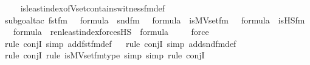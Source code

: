 \begin{isabellebody}
%
\isadelimproof
\isanewline
\ \ %
\endisadelimproof
%
\isatagproof
{}\isamarkupfalse%
\ is{\isacharunderscore}{\kern0pt}least{\isacharunderscore}{\kern0pt}index{\isacharunderscore}{\kern0pt}of{\isacharunderscore}{\kern0pt}Vset{\isacharunderscore}{\kern0pt}contains{\isacharunderscore}{\kern0pt}witness{\isacharunderscore}{\kern0pt}fm{\isacharunderscore}{\kern0pt}def\isanewline
\ \ \isamarkupfalse%
{\isacharparenleft}{\kern0pt}subgoal{\isacharunderscore}{\kern0pt}tac\ {\isachardoublequoteopen}fst{\isacharunderscore}{\kern0pt}fm{\isacharparenleft}{\kern0pt}{}{\isacharcomma}{\kern0pt}\ {}{\isacharparenright}{\kern0pt}\ {\isasymin}\ formula\ {\isasymand}\ snd{\isacharunderscore}{\kern0pt}fm{\isacharparenleft}{\kern0pt}{}{\isacharcomma}{\kern0pt}\ {}{\isacharparenright}{\kern0pt}\ {\isasymin}\ formula\ {\isasymand}\ is{\isacharunderscore}{\kern0pt}MVset{\isacharunderscore}{\kern0pt}fm{\isacharparenleft}{\kern0pt}{}{\isacharcomma}{\kern0pt}\ {}{\isacharparenright}{\kern0pt}\ {\isasymin}\ formula\ {\isasymand}\ is{\isacharunderscore}{\kern0pt}HS{\isacharunderscore}{\kern0pt}fm{\isacharparenleft}{\kern0pt}{}{}{\isacharcomma}{\kern0pt}\ {}{\isacharparenright}{\kern0pt}\ {\isasymin}\ formula\ {\isasymand}\ ren{\isacharunderscore}{\kern0pt}least{\isacharunderscore}{\kern0pt}index{\isacharparenleft}{\kern0pt}forcesHS{\isacharparenleft}{\kern0pt}{\isasymphi}{\isacharparenright}{\kern0pt}{\isacharparenright}{\kern0pt}\ {\isasymin}\ formula{\isachardoublequoteclose}{\isacharparenright}{\kern0pt}\isanewline
\ \ \ \isamarkupfalse%
\ force\isanewline
\ \ \isamarkupfalse%
{\isacharparenleft}{\kern0pt}rule\ conjI{\isacharcomma}{\kern0pt}\ simp\ add{\isacharcolon}{\kern0pt}fst{\isacharunderscore}{\kern0pt}fm{\isacharunderscore}{\kern0pt}def{\isacharparenright}{\kern0pt}\isanewline
\ \ \isamarkupfalse%
{\isacharparenleft}{\kern0pt}rule\ conjI{\isacharcomma}{\kern0pt}\ simp\ add{\isacharcolon}{\kern0pt}snd{\isacharunderscore}{\kern0pt}fm{\isacharunderscore}{\kern0pt}def{\isacharparenright}{\kern0pt}\isanewline
\ \ \isamarkupfalse%
{\isacharparenleft}{\kern0pt}rule\ conjI{\isacharcomma}{\kern0pt}\ rule\ is{\isacharunderscore}{\kern0pt}MVset{\isacharunderscore}{\kern0pt}fm{\isacharunderscore}{\kern0pt}type{\isacharcomma}{\kern0pt}\ simp{\isacharcomma}{\kern0pt}\ simp{\isacharcomma}{\kern0pt}\ rule\ conjI{\isacharparenright}{\kern0pt}\isanewline
\ \ \ \isamarkupfalse%

\end{isabellebody}
